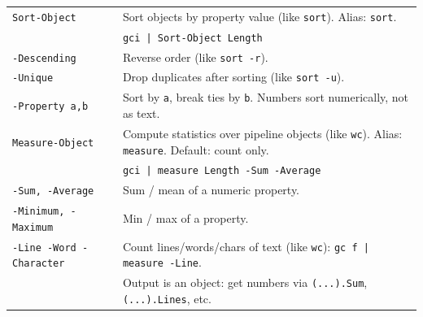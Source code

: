 \begin{tabularx}{\linewidth}{lX}
    \texttt{Sort-Object} & Sort objects by property value (like \texttt{sort}). Alias: \texttt{sort}.\\
    & \texttt{gci | Sort-Object Length}\\
    \texttt{-Descending} & Reverse order (like \texttt{sort -r}).\\
    \texttt{-Unique} & Drop duplicates after sorting (like \texttt{sort -u}).\\
    \texttt{-Property a,b} & Sort by \texttt{a}, break ties by \texttt{b}. Numbers sort numerically, not as text.\\
    \hline
    \texttt{Measure-Object} & Compute statistics over pipeline objects (like \texttt{wc}). Alias: \texttt{measure}. Default: count only.\\
    & \texttt{gci | measure Length -Sum -Average}\\
    \texttt{-Sum, -Average} & Sum / mean of a numeric property.\\
    \texttt{-Minimum, -Maximum} & Min / max of a property.\\
    \texttt{-Line -Word -Character} & Count lines/words/chars of text (like \texttt{wc}): \texttt{gc f | measure -Line}.\\
    & Output is an object: get numbers via \texttt{(...).Sum}, \texttt{(...).Lines}, etc.\\
    \hline
\end{tabularx}

\vfill\null
\columnbreak
